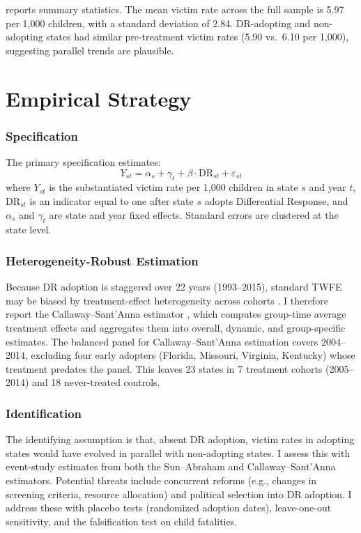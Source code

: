 \documentclass[12pt]{article}
\begin{document}
 reports summary statistics. The mean victim rate across the full sample is 5.97 per 1,000 children, with a standard deviation of 2.84. DR-adopting and non-adopting states had similar pre-treatment victim rates (5.90 vs.\ 6.10 per 1,000), suggesting parallel trends are plausible.

\section{Empirical Strategy}

\subsubsection*{Specification} The primary specification estimates:
\begin{equation}
Y_{st} = \alpha_s + \gamma_t + \beta \cdot \text{DR}_{st} + \varepsilon_{st}
\label{eq:twfe}
\end{equation}
where $Y_{st}$ is the substantiated victim rate per 1,000 children in state $s$ and year $t$, $\text{DR}_{st}$ is an indicator equal to one after state $s$ adopts Differential Response, and $\alpha_s$ and $\gamma_t$ are state and year fixed effects. Standard errors are clustered at the state level.

\subsubsection*{Heterogeneity-Robust Estimation} Because DR adoption is staggered over 22 years (1993--2015), standard TWFE may be biased by treatment-effect heterogeneity across cohorts \citep{GoodmanBacon2021, deCH2020}. I therefore report the Callaway--Sant'Anna estimator \citep{CallawayS2021}, which computes group-time average treatment effects and aggregates them into overall, dynamic, and group-specific estimates. The balanced panel for Callaway--Sant'Anna estimation covers 2004--2014, excluding four early adopters (Florida, Missouri, Virginia, Kentucky) whose treatment predates the panel. This leaves 23 states in 7 treatment cohorts (2005--2014) and 18 never-treated controls.

\subsubsection*{Identification} The identifying assumption is that, absent DR adoption, victim rates in adopting states would have evolved in parallel with non-adopting states. I assess this with event-study estimates from both the Sun--Abraham \citep{SunAbraham2021} and Callaway--Sant'Anna estimators. Potential threats include concurrent reforms (e.g., changes in screening criteria, resource allocation) and political selection into DR adoption. I address these with placebo tests (randomized adoption dates), leave-one-out sensitivity, and the falsification test on child fatalities.
\end{document}
